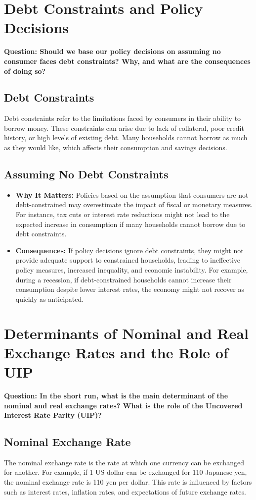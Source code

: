 \documentclass{article}
\begin{document}
\section{Debt Constraints and Policy Decisions}
\textbf{Question: Should we base our policy decisions on assuming no consumer faces debt constraints? Why, and what are the consequences of doing so?}

\subsection{Debt Constraints}
Debt constraints refer to the limitations faced by consumers in their ability to borrow money. These constraints can arise due to lack of collateral, poor credit history, or high levels of existing debt. Many households cannot borrow as much as they would like, which affects their consumption and savings decisions.

\subsection{Assuming No Debt Constraints}
\begin{itemize}
    \item \textbf{Why It Matters:} Policies based on the assumption that consumers are not debt-constrained may overestimate the impact of fiscal or monetary measures. For instance, tax cuts or interest rate reductions might not lead to the expected increase in consumption if many households cannot borrow due to debt constraints.
    \item \textbf{Consequences:} If policy decisions ignore debt constraints, they might not provide adequate support to constrained households, leading to ineffective policy measures, increased inequality, and economic instability. For example, during a recession, if debt-constrained households cannot increase their consumption despite lower interest rates, the economy might not recover as quickly as anticipated.
\end{itemize}

\section{Determinants of Nominal and Real Exchange Rates and the Role of UIP}
\textbf{Question: In the short run, what is the main determinant of the nominal and real exchange rates? What is the role of the Uncovered Interest Rate Parity (UIP)?}

\subsection{Nominal Exchange Rate}
The nominal exchange rate is the rate at which one currency can be exchanged for another. For example, if 1 US dollar can be exchanged for 110 Japanese yen, the nominal exchange rate is 110 yen per dollar. This rate is influenced by factors such as interest rates, inflation rates, and expectations of future exchange rates.
\end{document}
